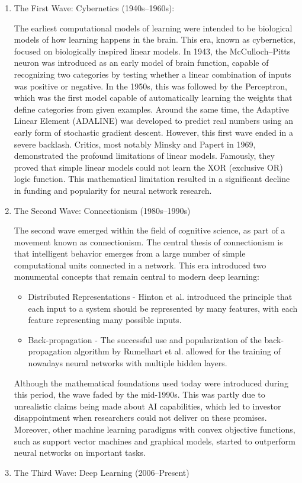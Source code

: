 \begin{enumerate}
	\item The First Wave: Cybernetics (1940s–1960s):
	
	The earliest computational models of learning were intended to be biological models of how learning happens in the brain. This era, known as cybernetics, focused on biologically inspired linear models.
	In 1943, the McCulloch–Pitts neuron was introduced as an early model of brain function, capable of recognizing two categories by testing whether a linear combination of inputs was positive or negative. In the 1950s, this was followed by the Perceptron, which was the first model capable of automatically learning the weights that define categories from given examples. Around the same time, the Adaptive Linear Element (ADALINE) was developed to predict real numbers using an early form of stochastic gradient descent. However, this first wave ended in a severe backlash. Critics, most notably Minsky and Papert in 1969, demonstrated the profound limitations of linear models. Famously, they proved that simple linear models could not learn the XOR (exclusive OR) logic function. This mathematical limitation resulted in a significant decline in funding and popularity for neural network research.
	
	\item The Second Wave: Connectionism (1980s–1990s)
	
	The second wave emerged within the field of cognitive science, as part of a movement known as connectionism. The central thesis of connectionism is that intelligent behavior emerges from a large number of simple computational units connected in a network.
	This era introduced two monumental concepts that remain central to modern deep learning:
	\begin{itemize}
		\item Distributed Representations - Hinton et al. introduced the principle that each input to a system should be represented by many features, with each feature representing many possible inputs.
		\item Back-propagation - The successful use and popularization of the back-propagation algorithm by Rumelhart et al. allowed for the training of nowadays neural networks with multiple hidden layers.
	\end{itemize}
	Although the mathematical foundations used today were introduced during this period, the wave faded by the mid-1990s. This was partly due to unrealistic claims being made about AI capabilities, which led to investor disappointment when researchers could not deliver on these promises. Moreover, other machine learning paradigms with convex objective functions, such as support vector machines and graphical models, started to outperform neural networks on important tasks.
	\item The Third Wave: Deep Learning (2006–Present)
	

\end{enumerate}

